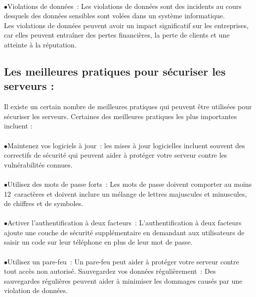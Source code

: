  \paragraph{ }$\bullet$Violations de données :  Les violations de données sont des incidents au cours desquels des données sensibles sont volées dans un système informatique.
 \\ Les violations de données peuvent avoir un impact significatif sur les entreprises, car elles peuvent entraîner des pertes financières, la perte de clients et une atteinte à la réputation.

 \paragraph{}\subsection{Les meilleures pratiques pour sécuriser les serveurs :}
 

Il existe un certain nombre de meilleures pratiques qui peuvent être utilisées pour sécuriser les serveurs. Certaines des meilleures pratiques les plus importantes incluent :

\paragraph{ } $\bullet$Maintenez vos logiciels à jour :   les mises à jour logicielles incluent souvent des correctifs de sécurité qui peuvent aider à protéger votre serveur contre les vulnérabilités connues.\\
 \paragraph{ }$\bullet$Utilisez des mots de passe forts :  Les mots de passe doivent comporter au moins 12 caractères et doivent inclure un mélange de lettres majuscules et minuscules, de chiffres et de symboles.\\
\paragraph{ }$\bullet$Activer l'authentification à deux facteurs :  L'authentification à deux facteurs ajoute une couche de sécurité supplémentaire en demandant aux utilisateurs de saisir un code sur leur téléphone en plus de leur mot de passe.\\
 \paragraph{ } $\bullet$Utilisez un pare-feu :  Un pare-feu peut aider à protéger votre serveur contre tout accès non autorisé.
 Sauvegardez vos données régulièrement :  Des sauvegardes régulières peuvent aider à minimiser les dommages causés par une violation de données.
